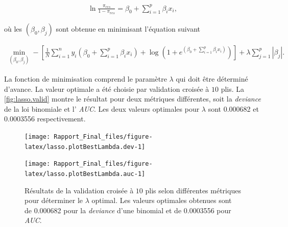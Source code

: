 \documentclass[]{article}
\begin{document}
\begin{align}
    \ln \frac{\pi_{res}}{1 - \pi_{res}} = \beta_0 + \sum_{i=1}^p \beta_i x_i,
\end{align}

où les \((\beta_0, \beta_j)\) sont obtenue en minimisant l'équation
suivant

\begin{align}
    \min\limits_{(\beta_0, \beta_j)} -\left[\frac{1}{N}\sum_{i=1}^n 
    y_i (\beta_0 + \sum_{i=1}^p \beta_i x_i) + 
    \log( 1 + e^{(\beta_0 + \sum_{i=1}^p \beta_i x_i)}) \right]
    + \lambda \sum_{j=1}^p |\beta_j|.
\end{align}

La fonction de minimisation comprend le paramètre \(\lambda\) qui doit
être déterminé d'avance. La valeur optimale a été choisie par validation
croisée à \(10\) plis. La \autoref{fig:lasso.valid} montre le résultat
pour deux métriques différentes, soit la \emph{deviance} de la loi
binomiale et l' \emph{AUC}. Les deux valeurs optimales pour \(\lambda\)
sont 0.000682 et 0.0003556 respectivement.

\begin{figure}
\centering
\begin{minipage}{0.48\linewidth}

\begin{center}\texttt{[image: Rapport\_Final\_files/figure-latex/lasso.plotBestLambda.dev-1]} \end{center}
\end{minipage}
\hfill
\begin{minipage}{0.48\linewidth}

\begin{center}\texttt{[image: Rapport\_Final\_files/figure-latex/lasso.plotBestLambda.auc-1]} \end{center}
\end{minipage}
\caption{Résultats de la validation croisée à $10$ plis selon différentes
métriques pour déterminer le $\lambda$ optimal. Les valeurs optimales obtenues
sont de 
0.000682 pour la 
\emph{deviance} d'une binomial et de
0.0003556 pour 
\emph{AUC}.}
\label{fig:lasso.valid}
\end{figure}
\end{document}
